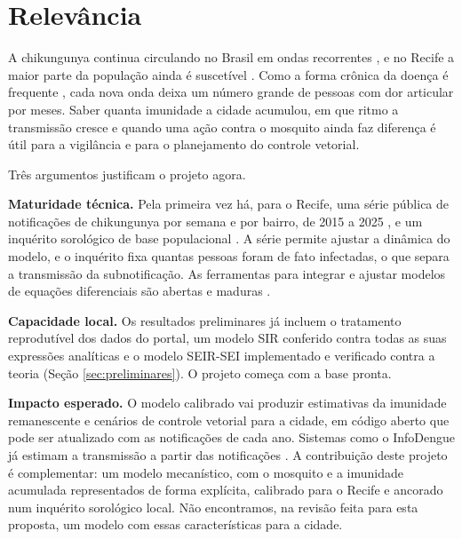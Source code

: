 \section{Relevância}
\label{sec:relevancia}

A chikungunya continua circulando no Brasil em ondas recorrentes \cite{desouza2023}, e no Recife a maior
parte da população ainda é suscetível \cite{braga2023}. Como a forma crônica da doença é frequente
\cite{paixao2018}, cada nova onda deixa um número grande de pessoas com dor articular por meses. Saber
quanta imunidade a cidade acumulou, em que ritmo a transmissão cresce e quando uma ação contra o mosquito
ainda faz diferença é útil para a vigilância e para o planejamento do controle vetorial.

Três argumentos justificam o projeto agora.

\textbf{Maturidade técnica.} Pela primeira vez há, para o Recife, uma série pública de notificações de
chikungunya por semana e por bairro, de 2015 a 2025 \cite{recife2026}, e um inquérito sorológico de base
populacional \cite{braga2023}. A série permite ajustar a dinâmica do modelo, e o inquérito fixa quantas
pessoas foram de fato infectadas, o que separa a transmissão da subnotificação. As ferramentas para
integrar e ajustar modelos de equações diferenciais são abertas e maduras \cite{rcore2025, soetaert2010}.

\textbf{Capacidade local.} Os resultados preliminares já incluem o tratamento reprodutível dos dados do
portal, um modelo SIR conferido contra todas as suas expressões analíticas e o modelo SEIR-SEI
implementado e verificado contra a teoria (Seção \ref{sec:preliminares}). O projeto começa com a base
pronta.

\textbf{Impacto esperado.} O modelo calibrado vai produzir estimativas da imunidade remanescente e cenários
de controle vetorial para a cidade, em código aberto que pode ser atualizado com as notificações de cada
ano. Sistemas como o InfoDengue já estimam a transmissão a partir das notificações \cite{codeco2018}. A
contribuição deste projeto é complementar: um modelo mecanístico, com o mosquito e a imunidade acumulada
representados de forma explícita, calibrado para o Recife e ancorado num inquérito sorológico local. Não
encontramos, na revisão feita para esta proposta, um modelo com essas características para a cidade.
